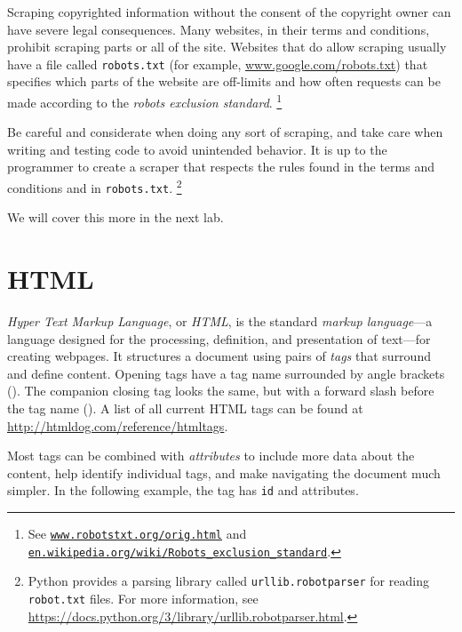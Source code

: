 \begin{warn} %
Scraping copyrighted information without the consent of the copyright owner can have severe legal consequences.
Many websites, in their terms and conditions, prohibit scraping parts or all of the site.
Websites that do allow scraping usually have a file called \texttt{robots.txt} (for example, \url{www.google.com/robots.txt}) that specifies which parts of the website are off-limits and how often requests can be made according to the \emph{robots exclusion standard}.%
\footnote{See \href{http://www.robotstxt.org/orig.html}{\texttt{www.robotstxt.org/orig.html}} and \href{https://en.wikipedia.org/wiki/Robots_exclusion_standard}{\texttt{en.wikipedia.org/wiki/Robots\_exclusion\_standard}}.}

Be careful and considerate when doing any sort of scraping, and take care when writing and testing code to avoid unintended behavior.
It is up to the programmer to create a scraper that respects the rules found in the terms and conditions and in \texttt{robots.txt}.%
\footnote{Python provides a parsing library called \texttt{urllib.robotparser} for reading \texttt{robot.txt} files.
For more information, see \url{https://docs.python.org/3/library/urllib.robotparser.html}.
}

We will cover this more in the next lab.
\end{warn}

\section*{HTML} %

\emph{Hyper Text Markup Language}, or \emph{HTML}, is the standard \emph{markup language}---a language designed for the processing, definition, and presentation of text---for creating webpages.
It structures a document using pairs of \emph{tags} that surround and define content.
Opening tags have a tag name surrounded by angle brackets ().
The companion closing tag looks the same, but with a forward slash before the tag name ().
A list of all current HTML tags can be found at \url{http://htmldog.com/reference/htmltags}.

Most tags can be combined with \emph{attributes} to include more data about the content, help identify individual tags, and make navigating the document much simpler.
In the following example, the  tag has \lstinline[language=HTML]{id} and  attributes.

